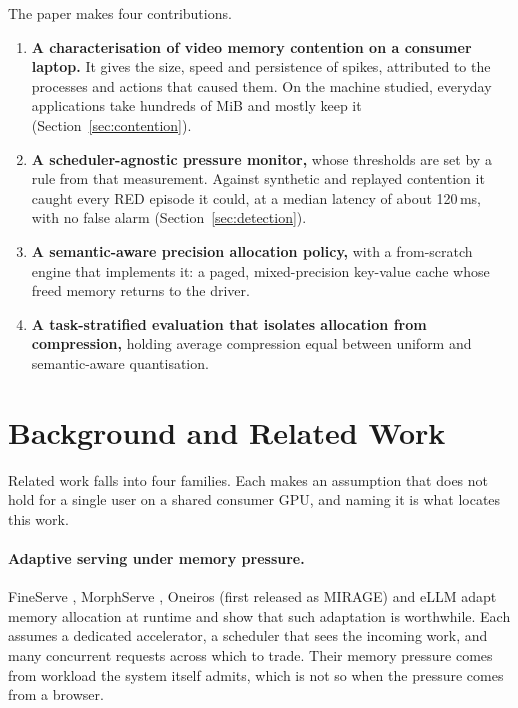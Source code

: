 \documentclass[11pt]{article}
\begin{document}
The paper makes four contributions.
\begin{enumerate}
\item \textbf{A characterisation of video memory contention on a consumer
laptop.} It gives the size, speed and persistence of spikes, attributed to the
processes and actions that caused them. On the machine studied, everyday
applications take hundreds of MiB and mostly keep it
(Section~\ref{sec:contention}).
\item \textbf{A scheduler-agnostic pressure monitor,} whose thresholds are set by
a rule from that measurement. Against synthetic and replayed contention it
caught every RED episode it could, at a median latency of about 120\,ms, with no
false alarm (Section~\ref{sec:detection}).
\item \textbf{A semantic-aware precision allocation policy,} with a from-scratch
engine that implements it: a paged, mixed-precision key-value cache whose freed
memory returns to the driver.
\item \textbf{A task-stratified evaluation that isolates allocation from
compression,} holding average compression equal between uniform and
semantic-aware quantisation.
\end{enumerate}

\section{Background and Related Work}
\label{sec:background}

Related work falls into four families. Each makes an assumption that does not
hold for a single user on a shared consumer GPU, and naming it is what locates
this work.

\paragraph{Adaptive serving under memory pressure.} FineServe
\cite{fineserve}, MorphServe \cite{morphserve}, Oneiros \cite{mirage} (first
released as MIRAGE) and eLLM \cite{ellm} adapt memory allocation at runtime and
show that such adaptation is worthwhile. Each assumes a dedicated accelerator, a
scheduler that sees the incoming work, and many concurrent requests across which
to trade. Their memory pressure comes from workload the system itself admits,
which is not so when the pressure comes from a browser.
\end{document}
